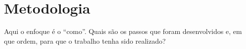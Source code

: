 \chapter{Metodologia}
\label{chp:metodologia}

Aqui o enfoque é o ``como''.  Quais são os passos que foram desenvolvidos e, em que ordem, para que o trabalho tenha sido realizado? \lipsum[5]
